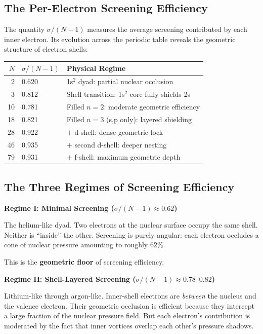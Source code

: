 \subsection{The Per-Electron Screening Efficiency}

The quantity $\sigma/(N{-}1)$ measures the average screening contributed by each inner electron.  Its evolution across the periodic table reveals the geometric structure of electron shells:

\begin{center}
\begin{tabular}{rll}
\hline
$N$ & $\sigma/(N{-}1)$ & \textbf{Physical Regime} \\
\hline
 2 & 0.620 & 1s$^2$ dyad: partial nuclear occlusion \\
 3 & 0.812 & Shell transition: 1s$^2$ core fully shields 2s \\
10 & 0.781 & Filled $n = 2$: moderate geometric efficiency \\
18 & 0.821 & Filled $n = 3$ (s,p only): layered shielding \\
28 & 0.922 & $+$ d-shell: dense geometric lock \\
46 & 0.935 & $+$ second d-shell: deeper nesting \\
79 & 0.931 & $+$ f-shell: maximum geometric depth \\
\hline
\end{tabular}
\end{center}

\subsection{The Three Regimes of Screening Efficiency}

\textbf{Regime I: Minimal Screening ($\sigma/(N{-}1) \approx 0.62$)}

The helium-like dyad.  Two electrons at the nuclear surface occupy the same shell.  Neither is ``inside'' the other.  Screening is purely angular: each electron occludes a cone of nuclear pressure amounting to roughly $62\%$.

This is the \textbf{geometric floor} of screening efficiency.

\textbf{Regime II: Shell-Layered Screening ($\sigma/(N{-}1) \approx 0.78\text{--}0.82$)}

Lithium-like through argon-like.  Inner-shell electrons are \emph{between} the nucleus and the valence electron.  Their geometric occlusion is efficient because they intercept a large fraction of the nuclear pressure field.  But each electron's contribution is moderated by the fact that inner vortices overlap each other's pressure shadows.

